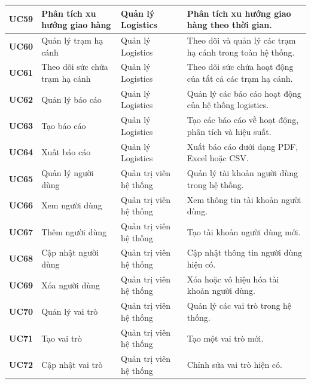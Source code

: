 \begin{longtable}{|p{1.2cm}|p{3.5cm}|p{2.8cm}|p{6.5cm}|}
\textbf{UC59} & Phân tích xu hướng giao hàng & Quản lý Logistics &
Phân tích xu hướng giao hàng theo thời gian. \\
\hline

\textbf{UC60} & Quản lý trạm hạ cánh & Quản lý Logistics &
Theo dõi và quản lý các trạm hạ cánh trong toàn hệ thống. \\
\hline

\textbf{UC61} & Theo dõi sức chứa trạm hạ cánh & Quản lý Logistics &
Theo dõi sức chứa hoạt động của tất cả các trạm hạ cánh. \\
\hline

\textbf{UC62} & Quản lý báo cáo & Quản lý Logistics &
Quản lý các báo cáo hoạt động của hệ thống logistics. \\
\hline

\textbf{UC63} & Tạo báo cáo & Quản lý Logistics &
Tạo các báo cáo về hoạt động, phân tích và hiệu suất. \\
\hline

\textbf{UC64} & Xuất báo cáo & Quản lý Logistics &
Xuất báo cáo dưới dạng PDF, Excel hoặc CSV. \\
\hline

\textbf{UC65} & Quản lý người dùng & Quản trị viên hệ thống &
Quản lý tài khoản người dùng trong hệ thống. \\
\hline

\textbf{UC66} & Xem người dùng & Quản trị viên hệ thống &
Xem thông tin tài khoản người dùng. \\
\hline

\textbf{UC67} & Thêm người dùng & Quản trị viên hệ thống &
Tạo tài khoản người dùng mới. \\
\hline

\textbf{UC68} & Cập nhật người dùng & Quản trị viên hệ thống &
Cập nhật thông tin người dùng hiện có. \\
\hline

\textbf{UC69} & Xóa người dùng & Quản trị viên hệ thống &
Xóa hoặc vô hiệu hóa tài khoản người dùng. \\
\hline

\textbf{UC70} & Quản lý vai trò & Quản trị viên hệ thống &
Quản lý các vai trò trong hệ thống. \\
\hline

\textbf{UC71} & Tạo vai trò & Quản trị viên hệ thống &
Tạo một vai trò mới. \\
\hline

\textbf{UC72} & Cập nhật vai trò & Quản trị viên hệ thống &
Chỉnh sửa vai trò hiện có. \\
\hline


\end{longtable}
